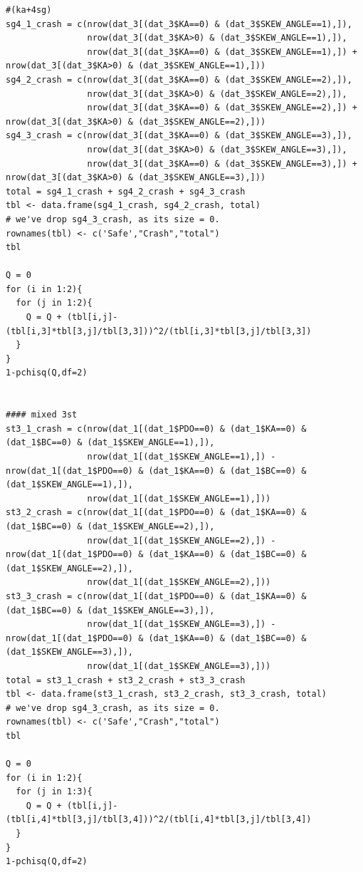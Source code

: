 \documentclass[11pt]{scrartcl} %
\begin{document}
\begin{lstlisting}
#(ka+4sg)
sg4_1_crash = c(nrow(dat_3[(dat_3$KA==0) & (dat_3$SKEW_ANGLE==1),]),
                nrow(dat_3[(dat_3$KA>0) & (dat_3$SKEW_ANGLE==1),]),
                nrow(dat_3[(dat_3$KA==0) & (dat_3$SKEW_ANGLE==1),]) + nrow(dat_3[(dat_3$KA>0) & (dat_3$SKEW_ANGLE==1),]))
sg4_2_crash = c(nrow(dat_3[(dat_3$KA==0) & (dat_3$SKEW_ANGLE==2),]),
                nrow(dat_3[(dat_3$KA>0) & (dat_3$SKEW_ANGLE==2),]),
                nrow(dat_3[(dat_3$KA==0) & (dat_3$SKEW_ANGLE==2),]) + nrow(dat_3[(dat_3$KA>0) & (dat_3$SKEW_ANGLE==2),]))
sg4_3_crash = c(nrow(dat_3[(dat_3$KA==0) & (dat_3$SKEW_ANGLE==3),]),
                nrow(dat_3[(dat_3$KA>0) & (dat_3$SKEW_ANGLE==3),]),
                nrow(dat_3[(dat_3$KA==0) & (dat_3$SKEW_ANGLE==3),]) + nrow(dat_3[(dat_3$KA>0) & (dat_3$SKEW_ANGLE==3),]))
total = sg4_1_crash + sg4_2_crash + sg4_3_crash
tbl <- data.frame(sg4_1_crash, sg4_2_crash, total)
# we've drop sg4_3_crash, as its size = 0.
rownames(tbl) <- c('Safe',"Crash","total")
tbl

Q = 0
for (i in 1:2){
  for (j in 1:2){
    Q = Q + (tbl[i,j]-(tbl[i,3]*tbl[3,j]/tbl[3,3]))^2/(tbl[i,3]*tbl[3,j]/tbl[3,3])
  }
}
1-pchisq(Q,df=2)


#### mixed 3st
st3_1_crash = c(nrow(dat_1[(dat_1$PDO==0) & (dat_1$KA==0) & (dat_1$BC==0) & (dat_1$SKEW_ANGLE==1),]),
                nrow(dat_1[(dat_1$SKEW_ANGLE==1),]) - nrow(dat_1[(dat_1$PDO==0) & (dat_1$KA==0) & (dat_1$BC==0) & (dat_1$SKEW_ANGLE==1),]),
                nrow(dat_1[(dat_1$SKEW_ANGLE==1),]))
st3_2_crash = c(nrow(dat_1[(dat_1$PDO==0) & (dat_1$KA==0) & (dat_1$BC==0) & (dat_1$SKEW_ANGLE==2),]),
                nrow(dat_1[(dat_1$SKEW_ANGLE==2),]) - nrow(dat_1[(dat_1$PDO==0) & (dat_1$KA==0) & (dat_1$BC==0) & (dat_1$SKEW_ANGLE==2),]),
                nrow(dat_1[(dat_1$SKEW_ANGLE==2),]))
st3_3_crash = c(nrow(dat_1[(dat_1$PDO==0) & (dat_1$KA==0) & (dat_1$BC==0) & (dat_1$SKEW_ANGLE==3),]),
                nrow(dat_1[(dat_1$SKEW_ANGLE==3),]) - nrow(dat_1[(dat_1$PDO==0) & (dat_1$KA==0) & (dat_1$BC==0) & (dat_1$SKEW_ANGLE==3),]),
                nrow(dat_1[(dat_1$SKEW_ANGLE==3),]))
total = st3_1_crash + st3_2_crash + st3_3_crash
tbl <- data.frame(st3_1_crash, st3_2_crash, st3_3_crash, total)
# we've drop sg4_3_crash, as its size = 0.
rownames(tbl) <- c('Safe',"Crash","total")
tbl

Q = 0
for (i in 1:2){
  for (j in 1:3){
    Q = Q + (tbl[i,j]-(tbl[i,4]*tbl[3,j]/tbl[3,4]))^2/(tbl[i,4]*tbl[3,j]/tbl[3,4])
  }
}
1-pchisq(Q,df=2)


\end{lstlisting}
\end{document}
